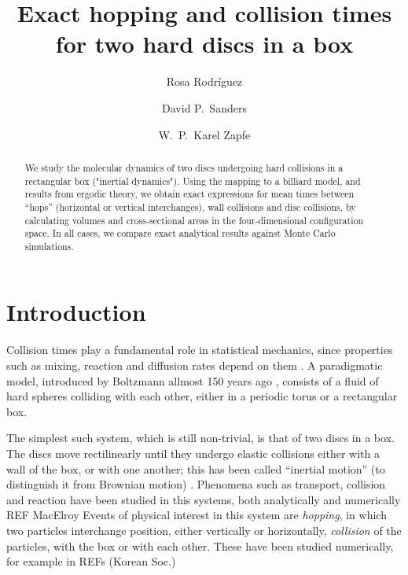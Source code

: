 \documentclass[superscriptaddress,pre,reprint,showpacs,onecolumn]{revtex4-1}
\begin{document}
\title{Exact hopping and collision times for two hard discs in a box}

\author{Rosa Rodríguez}

\author{David P.~Sanders}

\author{W.~P.~Karel Zapfe}



\begin{abstract}
We study the molecular dynamics of two discs undergoing hard collisions in a rectangular box ("inertial dynamics").
Using the mapping to a billiard model, and results from ergodic theory, we obtain exact expressions for mean times between ``hops'' (horizontal or vertical interchanges), wall collisions and disc collisions, by calculating
volumes and cross-sectional areas in the four-dimensional configuration space.
In all cases, we compare exact analytical results against Monte Carlo simulations.
\end{abstract}

\maketitle



\section{Introduction}


Collision times play a fundamental role in statistical mechanics, since properties
such as mixing, reaction and diffusion rates depend on them \cite{Boltz72, Tolman, VanKampen}.
A paradigmatic model, introduced by Boltzmann allmost 150 years ago \cite{Boltz72, SzaszBook00},
consists of a fluid of hard spheres colliding with each other, either in a periodic torus or 
a rectangular box.

The simplest such system, which is still non-trivial, is that of two discs in a box.
The discs move rectilinearly until they undergo
elastic collisions either with a wall of the box, or with one another; this has been called ``inertial motion'' (to distinguish it from Brownian motion) \cite{Bowles04}.
Phenomena such as transport, collision and reaction
have been studied in this systems, both analytically 
 \cite{Awazu01, Munakata02, Suh05} and numerically REF MacElroy
 Events of physical interest in this system are \emph{hopping},
in which two particles interchange position, either vertically or horizontally,
\emph{collision} of the particles, with the box or with each other.
These have been studied numerically, for example in REFs (Korean Soc.)
 
\end{document}

